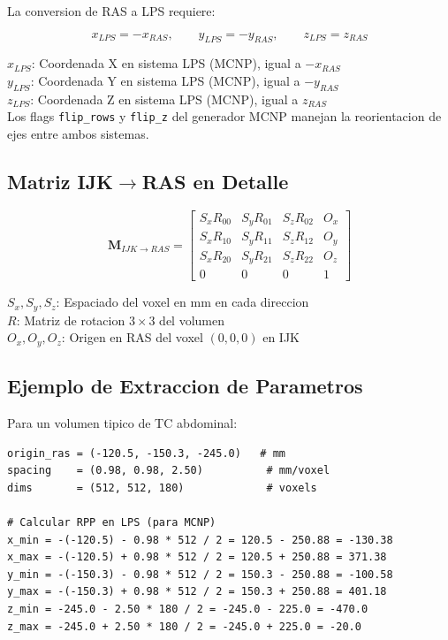 \documentclass[12pt,a4paper]{article}
\newcommand{\vardef}[2]{\noindent\textbf{#1}: #2\\}
\begin{document}
La conversion de RAS a LPS requiere:

$$
x_{LPS} = -x_{RAS},\qquad y_{LPS} = -y_{RAS},\qquad z_{LPS} = z_{RAS}
$$

\vardef{$x_{LPS}$}{Coordenada X en sistema LPS (MCNP), igual a $-x_{RAS}$}
\vardef{$y_{LPS}$}{Coordenada Y en sistema LPS (MCNP), igual a $-y_{RAS}$}
\vardef{$z_{LPS}$}{Coordenada Z en sistema LPS (MCNP), igual a $z_{RAS}$}

Los flags \texttt{flip\_rows} y \texttt{flip\_z} del generador MCNP manejan la reorientacion de ejes entre ambos sistemas.

\subsection{Matriz IJK$\to$RAS en Detalle}

$$
\mathbf{M}_{IJK \to RAS} = \begin{bmatrix}
S_x R_{00} & S_y R_{01} & S_z R_{02} & O_x \\
S_x R_{10} & S_y R_{11} & S_z R_{12} & O_y \\
S_x R_{20} & S_y R_{21} & S_z R_{22} & O_z \\
0 & 0 & 0 & 1
\end{bmatrix}
$$

\vardef{$S_x, S_y, S_z$}{Espaciado del voxel en mm en cada direccion}
\vardef{$R$}{Matriz de rotacion $3\times3$ del volumen}
\vardef{$O_x, O_y, O_z$}{Origen en RAS del voxel $(0,0,0)$ en IJK}

\subsection{Ejemplo de Extraccion de Parametros}

Para un volumen tipico de TC abdominal:

\begin{verbatim}
origin_ras = (-120.5, -150.3, -245.0)   # mm
spacing    = (0.98, 0.98, 2.50)          # mm/voxel
dims       = (512, 512, 180)             # voxels

# Calcular RPP en LPS (para MCNP)
x_min = -(-120.5) - 0.98 * 512 / 2 = 120.5 - 250.88 = -130.38
x_max = -(-120.5) + 0.98 * 512 / 2 = 120.5 + 250.88 = 371.38
y_min = -(-150.3) - 0.98 * 512 / 2 = 150.3 - 250.88 = -100.58
y_max = -(-150.3) + 0.98 * 512 / 2 = 150.3 + 250.88 = 401.18
z_min = -245.0 - 2.50 * 180 / 2 = -245.0 - 225.0 = -470.0
z_max = -245.0 + 2.50 * 180 / 2 = -245.0 + 225.0 = -20.0
\end{verbatim}
\end{document}
